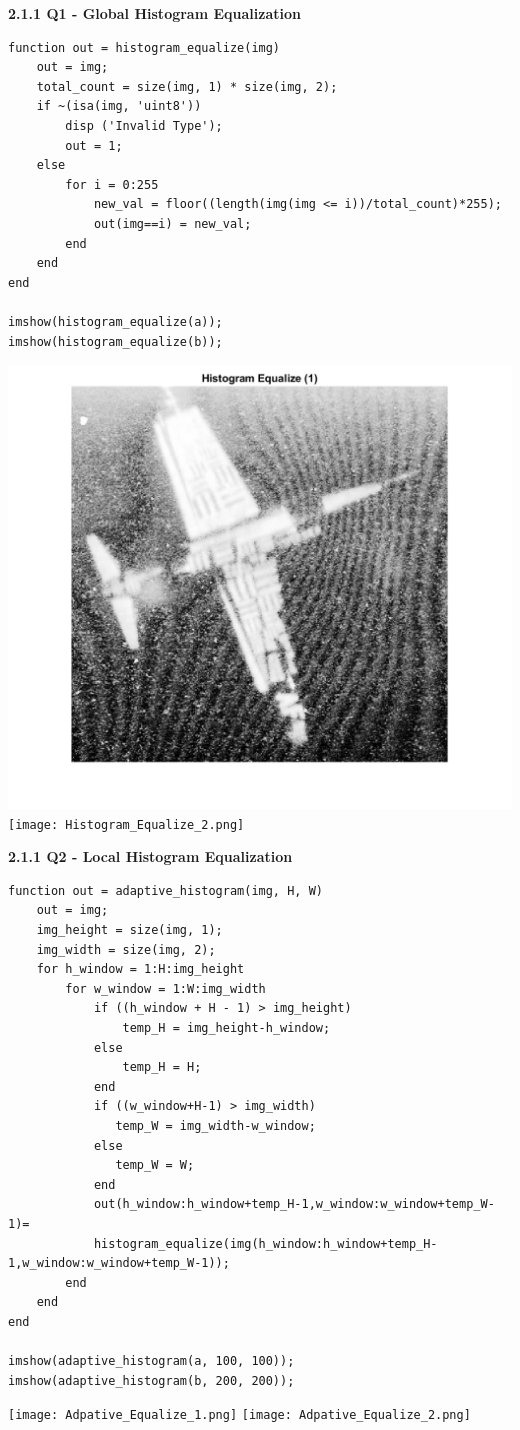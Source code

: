 \documentclass[
]{article}
\begin{document}
\pagebreak

\textbf{2.1.1 Q1 - Global Histogram Equalization}
\begin{verbatim}
function out = histogram_equalize(img)
    out = img;
    total_count = size(img, 1) * size(img, 2);
    if ~(isa(img, 'uint8'))
        disp ('Invalid Type');
        out = 1;
    else
        for i = 0:255
            new_val = floor((length(img(img <= i))/total_count)*255);
            out(img==i) = new_val;
        end
    end
end

imshow(histogram_equalize(a));
imshow(histogram_equalize(b));

\end{verbatim}

\includegraphics[width=0.5\columnwidth]{Histogram_Equalize_1.png}
\texttt{[image: Histogram\_Equalize\_2.png]}

\pagebreak

\textbf{2.1.1 Q2 - Local Histogram Equalization}
\begin{verbatim}
function out = adaptive_histogram(img, H, W)
    out = img;
    img_height = size(img, 1);
    img_width = size(img, 2);
    for h_window = 1:H:img_height
        for w_window = 1:W:img_width
            if ((h_window + H - 1) > img_height)
                temp_H = img_height-h_window;
            else
                temp_H = H;
            end
            if ((w_window+H-1) > img_width)
               temp_W = img_width-w_window; 
            else
               temp_W = W;
            end
            out(h_window:h_window+temp_H-1,w_window:w_window+temp_W-1)=
            histogram_equalize(img(h_window:h_window+temp_H-1,w_window:w_window+temp_W-1));
        end
    end
end

imshow(adaptive_histogram(a, 100, 100));
imshow(adaptive_histogram(b, 200, 200));

\end{verbatim}
\texttt{[image: Adpative\_Equalize\_1.png]}
\texttt{[image: Adpative\_Equalize\_2.png]}
\end{document}
